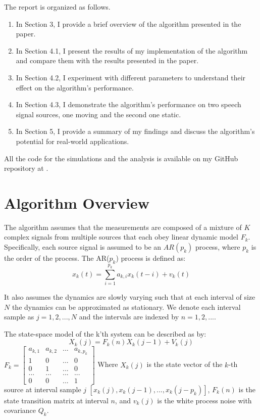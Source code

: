 \documentclass{article}
\begin{document}
The report is organized as follows.

\begin{enumerate}
    \item In Section 3, I provide a brief overview of the algorithm presented in the paper.
    \item In Section 4.1, I present the results of my implementation of the algorithm and compare them with the results presented in the paper.
    \item In Section 4.2, I experiment with different parameters to understand their effect on the algorithm's performance.
    \item In Section 4.3, I demonstrate the algorithm's performance on two speech signal sources, one moving and the second one static.
    \item In Section 5, I provide a summary of my findings and discuss the algorithm's potential for real-world applications.
\end{enumerate}

All the code for the simulations and the analysis is available on my GitHub repository at \cite{}.

\section{Algorithm Overview}
The algorithm assumes that the measurements are composed of a mixture of $K$ complex signals from multiple sources that each obey linear dynamic model $F_k$.
Specifically, each source signal is assumed to be an $AR(p_k)$ process, where $p_k$ is the order of the process.
The AR($p_k$) process is defined as:
\begin{equation}
    x_k(t) = \sum_{i=1}^{p_k} a_{k,i} x_k(t-i) + v_k(t)
\end{equation}


It also assumes the dynamics are slowly varying such that at each interval of size $N$ the dynamics can be approximated as stationary.
We denote each interval sample as $j = 1, 2, ..., N$ and the intervals are indexed by $n = 1, 2, ...$.


The state-space model of the k'th system can be described as by:
\begin{equation}
    X_k(j) = F_k(n) X_k(j-1) + V_k(j)
\end{equation}
\vspace{1em}
$F_k = \begin{bmatrix}
    a_{k,1} & a_{k,2} & ... & a_{k,p_k} \\
    1 & 0 & ... & 0 \\
    0 & 1 & ... & 0 \\ 
    ... & ... & ... & ... \\
    0 & 0 & ... & 1
\end{bmatrix}$
\vspace{1em}
Where $X_k(j)$ is the state vector of the $k$-th source at interval sample $j$ $[x_k(j),x_k(j-1),...,x_k(j-p_k)]$, $F_k(n)$ is the state transition matrix at interval $n$, and $v_k(j)$ is the white process noise with covariance $Q_k$.
\end{document}
